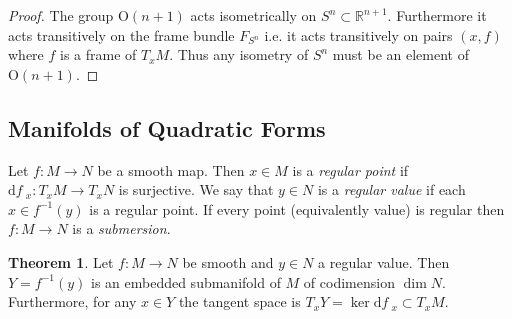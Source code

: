 \documentclass[12pt]{extarticle}
\newcommand{\R}{\mathbb{R}}
\renewcommand{\d}[1]{ \mathrm{d}#1 \:}
\theoremstyle{definition}
\newtheorem{theorem}{Theorem}[section]
\newenvironment{definition}[1][Definition:]{\begin{trivlist}
\item[\hskip \labelsep {\bfseries #1}]}{\end{trivlist}}
\newcommand{\Orth}[1]{\mathrm{O}\left(#1\right)}
\begin{document}
\begin{proof}
The group $\Orth{n+1}$ acts isometrically on $S^n \subset \R^{n+1}$. Furthermore it acts transitively on the frame bundle $F_{S^n}$ i.e. it acts transitively on pairs $(x, f)$ where $f$ is a frame of $T_x M$. Thus any isometry of $S^n$ must be an element of $\Orth{n+1}$. 
\end{proof}

\subsection{Manifolds of Quadratic Forms}

\begin{definition}
Let $f : M \to N$ be a smooth map. Then $x \in M$ is a \textit{regular point} if $\d{f}_x : T_x M \to T_x N$ is surjective. We say that $y \in N$ is a \textit{regular value} if each $x \in f^{-1}(y)$ is a regular point. If every point (equivalently value) is regular then $f : M \to N$ is a \textit{submersion}. 
\end{definition}

\begin{theorem}
Let $f : M \to N$ be smooth and $y \in N$ a regular value. Then $Y = f^{-1}(y)$ is an embedded submanifold of $M$ of codimension $\dim{N}$. Furthermore, for any $x \in Y$ the tangent space is $T_x Y = \ker{\d{f}_x} \subset T_x M$. 
\end{theorem}
\end{document}
